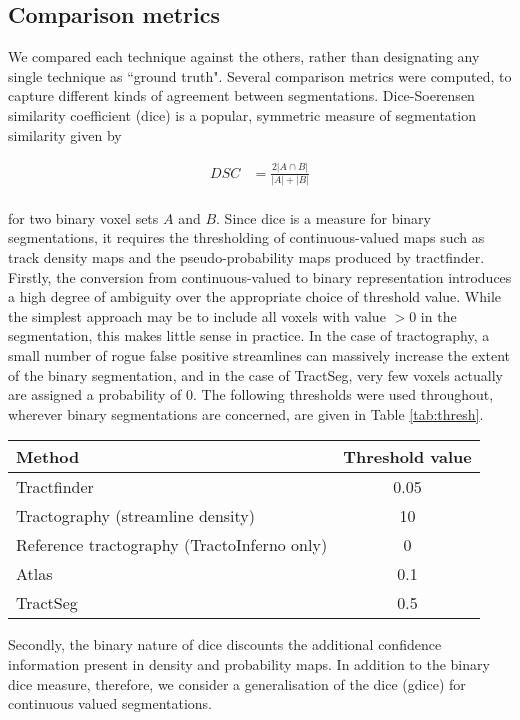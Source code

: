 \subsection{Comparison metrics}

We compared each technique against the others, rather than designating any single technique as ``ground truth".
Several comparison metrics were computed, to capture different kinds of agreement between segmentations.
Dice-Soerensen similarity coefficient (\gls{dice}) \autocite{Dice1945} is a popular, symmetric measure of segmentation similarity given by

\begin{align}
  DSC &= \frac{2 |A \cap B|}{|A| + |B|} \\
\end{align}

for two binary voxel sets $A$ and $B$.
Since \gls{dice} is a measure for binary segmentations, it requires the thresholding of continuous-valued maps such as track density maps and the pseudo-probability maps produced by tractfinder.
Firstly, the conversion from continuous-valued to binary representation introduces a high degree of ambiguity over the appropriate choice of threshold value.
While the simplest approach may be to include all voxels with value $>0$ in the segmentation, this makes little sense in practice.
In the case of tractography, a small number of rogue false positive streamlines can massively increase the extent of the binary segmentation, and in the case of TractSeg, very few voxels actually are assigned a probability of 0.
The following thresholds were used throughout, wherever binary segmentations are concerned, are given in Table \ref{tab:thresh}.

\begin{tabularx}{0.5\textwidth}{X c}
  Method    & Threshold value \\
  \hline
  Tractfinder   & 0.05 \\
  Tractography (streamline density)  & 10 \\
  Reference tractography (TractoInferno only) & 0 \\
  Atlas         & 0.1 \\
  TractSeg      & 0.5 \\
  \hline
\end{tabularx}

Secondly, the binary nature of \gls{dice} discounts the additional confidence information present in density and probability maps.
In addition to the binary \gls{dice} measure, therefore, we consider a generalisation of the \gls{dice} (\gls{gdice}) for continuous valued segmentations.

